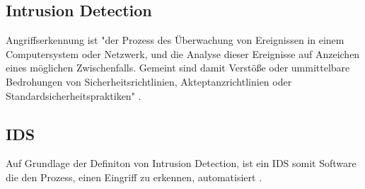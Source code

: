 \subsection{Intrusion Detection}
Angriffserkennung ist "der Prozess des Überwachung von Ereignissen in einem Computersystem oder Netzwerk, und die Analyse dieser Ereignisse auf Anzeichen eines möglichen Zwischenfalls. Gemeint sind damit Verstöße oder ummittelbare Bedrohungen von Sicherheitsrichtlinien, Akteptanzrichtlinien oder Standardsicherheitspraktiken" \cite{scarfone2007guide}. 

\subsection{IDS}
Auf Grundlage der Definiton von Intrusion Detection, ist ein IDS somit Software die den Prozess, einen Eingriff zu erkennen, automatisiert \cite{scarfone2007guide}. 





